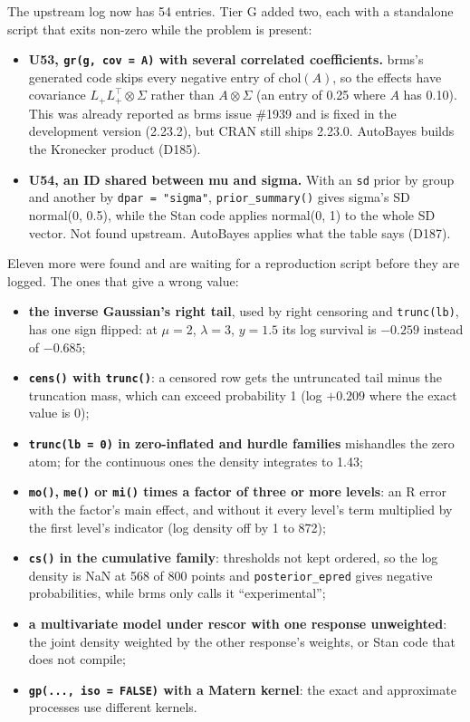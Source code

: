 \documentclass[11pt]{article}
\newcommand{\code}[1]{\texttt{#1}}
\begin{document}
The upstream log now has 54 entries. Tier G added two, each with a standalone script that exits non-zero while the problem
is present:
\begin{itemize}
\item \textbf{U53, \code{gr(g, cov = A)} with several correlated coefficients.} brms's generated code skips every negative
  entry of $\mathrm{chol}(A)$, so the effects have covariance $L_+ L_+^\top \otimes \Sigma$ rather than $A \otimes \Sigma$
  (an entry of 0.25 where $A$ has 0.10). This was already reported as brms issue \#1939 and is fixed in the development
  version (2.23.2), but CRAN still ships 2.23.0. AutoBayes builds the Kronecker product (D185).
\item \textbf{U54, an ID shared between mu and sigma.} With an \code{sd} prior by group and another by \code{dpar = "sigma"},
  \code{prior\_summary()} gives sigma's SD normal(0, 0.5), while the Stan code applies normal(0, 1) to the whole SD vector.
  Not found upstream. AutoBayes applies what the table says (D187).
\end{itemize}
Eleven more were found and are waiting for a reproduction script before they are logged. The ones that give a wrong value:
\begin{itemize}
\item \textbf{the inverse Gaussian's right tail}, used by right censoring and \code{trunc(lb)}, has one sign flipped:
  at $\mu = 2$, $\lambda = 3$, $y = 1.5$ its log survival is $-0.259$ instead of $-0.685$;
\item \textbf{\code{cens()} with \code{trunc()}}: a censored row gets the untruncated tail minus the truncation mass, which
  can exceed probability 1 (log $+0.209$ where the exact value is 0);
\item \textbf{\code{trunc(lb = 0)} in zero-inflated and hurdle families} mishandles the zero atom; for the continuous ones
  the density integrates to 1.43;
\item \textbf{\code{mo()}, \code{me()} or \code{mi()} times a factor of three or more levels}: an R error with the factor's
  main effect, and without it every level's term multiplied by the first level's indicator (log density off by 1 to 872);
\item \textbf{\code{cs()} in the cumulative family}: thresholds not kept ordered, so the log density is NaN at 568 of 800
  points and \code{posterior\_epred} gives negative probabilities, while brms only calls it ``experimental'';
\item \textbf{a multivariate model under rescor with one response unweighted}: the joint density weighted by the other
  response's weights, or Stan code that does not compile;
\item \textbf{\code{gp(..., iso = FALSE)} with a Matern kernel}: the exact and approximate processes use different kernels.
\end{itemize}
\end{document}
